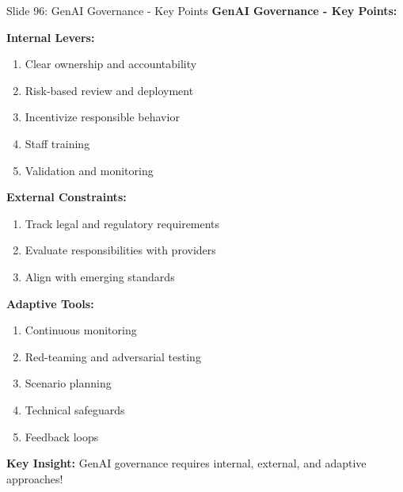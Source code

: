 \documentclass[8pt]{beamer}
\begin{document}
	\begin{frame}{Slide 96: GenAI Governance - Key Points}
		\fontsize{6.5}{7.5}\selectfont
		\textbf{GenAI Governance - Key Points:}
		
		\vspace{0.1cm}
		\textbf{Internal Levers:}
		\begin{enumerate}
			\item Clear ownership and accountability
			\item Risk-based review and deployment
			\item Incentivize responsible behavior
			\item Staff training
			\item Validation and monitoring
		\end{enumerate}
		
		\vspace{0.1cm}
		\textbf{External Constraints:}
		\begin{enumerate}
			\item Track legal and regulatory requirements
			\item Evaluate responsibilities with providers
			\item Align with emerging standards
		\end{enumerate}
		
		\vspace{0.1cm}
		\textbf{Adaptive Tools:}
		\begin{enumerate}
			\item Continuous monitoring
			\item Red-teaming and adversarial testing
			\item Scenario planning
			\item Technical safeguards
			\item Feedback loops
		\end{enumerate}
		
		\textcolor{myblue}{\textbf{Key Insight:}} GenAI governance requires \textcolor{myblue}{internal, external, and adaptive approaches}!
	\end{frame}
	
\end{document}
